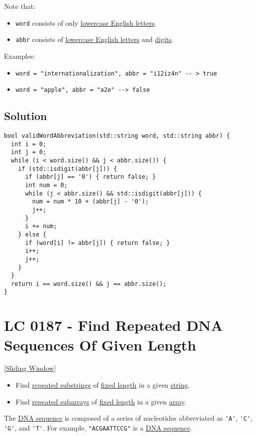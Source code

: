 {Note that:
\begin{itemize}
\item {\colorbox{CodeBackground}{\lstinline|word|}} consists of only \ul{lowercase English letters}.
\item {\colorbox{CodeBackground}{\lstinline|abbr|}} consists of \ul{lowercase English letters} and \ul{digits}.
\end{itemize}

Examples:
\begin{itemize}
\item {\colorbox{CodeBackground}{\lstinline|word = "internationalization", abbr = "i12iz4n" -- > true|}}
\item {\colorbox{CodeBackground}{\lstinline|word = "apple", abbr = "a2e" --> false|}}
\end{itemize}

\subsection*{Solution}
\begin{lstlisting}
bool validWordAbbreviation(std::string word, std::string abbr) {
  int i = 0;
  int j = 0;
  while (i < word.size() && j < abbr.size()) {
    if (std::isdigit(abbr[j])) {
      if (abbr[j] == '0') { return false; }
      int num = 0;
      while (j < abbr.size() && std::isdigit(abbr[j])) {
        num = num * 10 + (abbr[j] - '0');
        j++;
      }
      i += num;
    } else {
      if (word[i] != abbr[j]) { return false; }
      i++;
      j++;
    }
  }
  return i == word.size() && j == abbr.size();
}
\end{lstlisting}

\section{LC 0187 - Find Repeated DNA Sequences Of Given Length}\label{lc0187}
{\hyperref[sec:sliding_window]{[Sliding Window]}}\\
\begin{tcolorbox}
\begin{itemize}
\item Find \ul{repeated substrings} of \ul{fixed length} in a given \ul{string}.
\item Find \ul{repeated subarrays} of \ul{fixed length} in a given \ul{array}.
\end{itemize}
\end{tcolorbox}

The \ul{DNA sequence} is composed of a series of nucleotides abbreviated as {\colorbox{CodeBackground}{\lstinline|'A'|}}, {\colorbox{CodeBackground}{\lstinline|'C'|}}, {\colorbox{CodeBackground}{\lstinline|'G'|}}, and {\colorbox{CodeBackground}{\lstinline|'T'|}}. For example, {\colorbox{CodeBackground}{\lstinline|"ACGAATTCCG"|}} is a \ul{DNA sequence}.\\

}
